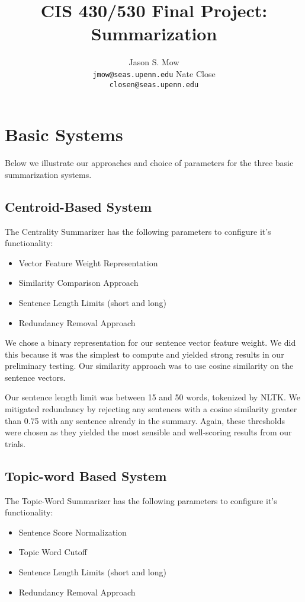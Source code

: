\documentclass[11pt,letterpaper]{article}
\title{CIS 430/530 Final Project: Summarization}
\author{Jason S. Mow\\
	    {\tt jmow@seas.upenn.edu}
	  \And Nate Close\\
  {\tt closen@seas.upenn.edu}}
\date{}
\begin{document}
\maketitle

\section{Basic Systems}
Below we illustrate our approaches and choice of parameters for the three basic summarization systems.
\subsection{Centroid-Based System}
The Centrality Summarizer has the following parameters to configure it's functionality:
\begin{itemize}
\item Vector Feature Weight Representation
\item Similarity Comparison Approach
\item Sentence Length Limits (short and long)
\item Redundancy Removal Approach
\end{itemize}
We chose a binary representation for our sentence vector feature weight. We did this because it was the simplest to compute and yielded strong results in our preliminary testing. Our similarity approach was to use cosine similarity on the sentence vectors.

Our sentence length limit was between 15 and 50 words, tokenized by NLTK. We mitigated redundancy by rejecting any sentences with a cosine similarity greater than 0.75 with any sentence already in the summary. Again, these thresholds were chosen as they yielded the most sensible and well-scoring results from our trials.

\subsection{Topic-word Based System}
The Topic-Word Summarizer has the following parameters to configure it's functionality:
\begin{itemize}
\item Sentence Score Normalization
\item Topic Word Cutoff
\item Sentence Length Limits (short and long)
\item Redundancy Removal Approach
\end{itemize}
\end{document}
